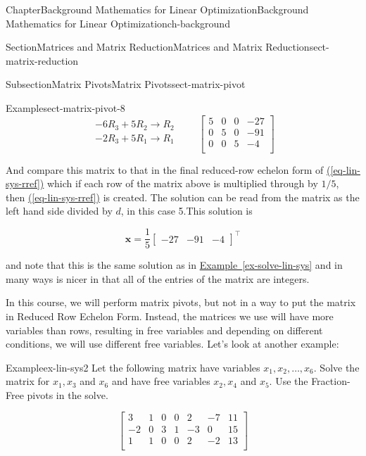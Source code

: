 \documentclass[oneside,10pt,]{book}
\newcommand{\xreffont}{\relax}
\numberwithin{equation}{section}
\newcommand{\amp}{&}
\begin{document}
\begin{chapterptx}{Chapter}{Background Mathematics for Linear Optimization}{}{Background Mathematics for Linear Optimization}{}{}{ch-background}
\begin{sectionptx}{Section}{Matrices and Matrix Reduction}{}{Matrices and Matrix Reduction}{}{}{sect-matrix-reduction}
\begin{subsectionptx}{Subsection}{Matrix Pivots}{}{Matrix Pivots}{}{}{sect-matrix-pivot}
\begin{example}{Example}{}{sect-matrix-pivot-8}
\begin{equation*}
\begin{array}{r} -6R_3 + 5R_2 \to R_2 \\ -2R_3 + 5R_1 \to R_1 \\ \end{array} \qquad \left[\begin{array}{rrr|r} 5 \amp 0 \amp 0 \amp -27\\ 0 \amp 5 \amp 0 \amp -91\\ 0 \amp 0 \amp 5 \amp -4\\ \end{array} \right]
\end{equation*}
%
\par
And compare this matrix to that in the final reduced-row echelon form of \hyperref[eq-lin-sys-rref]{({\xreffont\ref{eq-lin-sys-rref}})} which if each row of the matrix above is multiplied through by \(1/5\), then \hyperref[eq-lin-sys-rref]{({\xreffont\ref{eq-lin-sys-rref}})} is created. The solution can be read from the matrix as the left hand side divided by \(d\), in this case 5.This solution is%
\par
%
\begin{equation*}
\boldsymbol{x} = \frac{1}{5}\begin{bmatrix} -27 \amp -91 \amp -4 \end{bmatrix}^{\intercal}
\end{equation*}
%
\par
and note that this is the same solution as in \hyperref[ex-solve-lin-sys]{Example~{\xreffont\ref{ex-solve-lin-sys}}} and in many ways is nicer in that all of the entries of the matrix are integers.%
\end{example}
In this course, we will perform matrix pivots, but not in a way to put the matrix in Reduced Row Echelon Form. Instead, the matrices we use will have more variables than rows, resulting in free variables and depending on different conditions, we will use different free variables. Let's look at another example:%
\begin{example}{Example}{}{ex-lin-sys2}%
Let the following matrix have variables \(x_1, x_2, \ldots, x_6\). Solve the matrix for \(x_1,x_3\) and \(x_6\) and have free variables \(x_2, x_4\) and \(x_5\). Use the Fraction-Free pivots in the solve.%
\par
%
\begin{equation*}
\left[\begin{array}{rrrrrr|r} 3 \amp 1 \amp 0 \amp 0 \amp 2 \amp -7 \amp 11\\ -2 \amp 0 \amp 3 \amp 1 \amp -3 \amp 0 \amp 15\\ 1 \amp 1 \amp 0 \amp 0 \amp 2 \amp -2 \amp 13\\ \end{array} \right]

\end{equation*}
\end{example}
\end{subsectionptx}
\end{sectionptx}
\end{chapterptx}
\end{document}
